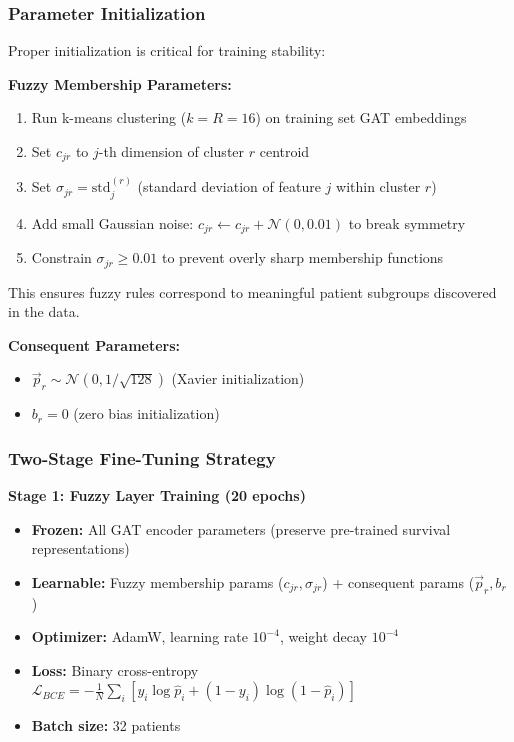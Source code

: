 \documentclass[conference]{IEEEtran}
\begin{document}
\subsubsection{Parameter Initialization}

Proper initialization is critical for training stability:

\textbf{Fuzzy Membership Parameters:}
\begin{enumerate}
\item Run k-means clustering ($k=R=16$) on training set GAT embeddings
\item Set $c_{jr}$ to $j$-th dimension of cluster $r$ centroid
\item Set $\sigma_{jr} = \text{std}_j^{(r)}$ (standard deviation of feature $j$ within cluster $r$)
\item Add small Gaussian noise: $c_{jr} \leftarrow c_{jr} + \mathcal{N}(0, 0.01)$ to break symmetry
\item Constrain $\sigma_{jr} \geq 0.01$ to prevent overly sharp membership functions
\end{enumerate}

This ensures fuzzy rules correspond to meaningful patient subgroups discovered in the data.

\textbf{Consequent Parameters:}
\begin{itemize}
\item $\vec{p}_r \sim \mathcal{N}(0, 1/\sqrt{128})$ (Xavier initialization)
\item $b_r = 0$ (zero bias initialization)
\end{itemize}

\subsubsection{Two-Stage Fine-Tuning Strategy}

\textbf{Stage 1: Fuzzy Layer Training (20 epochs)}
\begin{itemize}
\item \textbf{Frozen:} All GAT encoder parameters (preserve pre-trained survival representations)
\item \textbf{Learnable:} Fuzzy membership params ($c_{jr}, \sigma_{jr}$) + consequent params ($\vec{p}_r, b_r$)
\item \textbf{Optimizer:} AdamW, learning rate $10^{-4}$, weight decay $10^{-4}$
\item \textbf{Loss:} Binary cross-entropy $\mathcal{L}_{BCE} = -\frac{1}{N}\sum_i [y_i \log \hat{p}_i + (1-y_i)\log(1-\hat{p}_i)]$
\item \textbf{Batch size:} 32 patients
\end{itemize}
\end{document}
